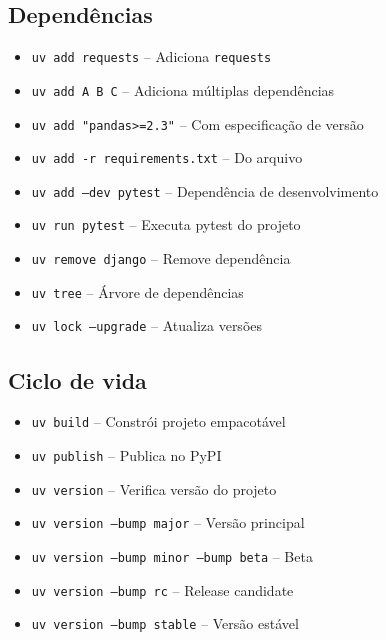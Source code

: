 \documentclass[a4paper,9pt]{article}
\begin{document}
\begin{multicols}{2}
\subsection*{Dependências}
\begin{itemize}[leftmargin=0.3cm]
    \item \texttt{uv add requests} -- Adiciona \texttt{requests}
    \item \texttt{uv add A B C} -- Adiciona múltiplas dependências
    \item \texttt{uv add "pandas>=2.3"} -- Com especificação de versão
    \item \texttt{uv add -r requirements.txt} -- Do arquivo
    \item \texttt{uv add --dev pytest} -- Dependência de desenvolvimento
    \item \texttt{uv run pytest} -- Executa pytest do projeto
    \item \texttt{uv remove django} -- Remove dependência
    \item \texttt{uv tree} -- Árvore de dependências
    \item \texttt{uv lock --upgrade} -- Atualiza versões
\end{itemize}

\subsection*{Ciclo de vida}
\begin{itemize}[leftmargin=0.3cm]
    \item \texttt{uv build} -- Constrói projeto empacotável
    \item \texttt{uv publish} -- Publica no PyPI
    \item \texttt{uv version} -- Verifica versão do projeto
    \item \texttt{uv version --bump major} -- Versão principal
    \item \texttt{uv version --bump minor --bump beta} -- Beta
    \item \texttt{uv version --bump rc} -- Release candidate
    \item \texttt{uv version --bump stable} -- Versão estável
\end{itemize}


\end{multicols}
\end{document}
